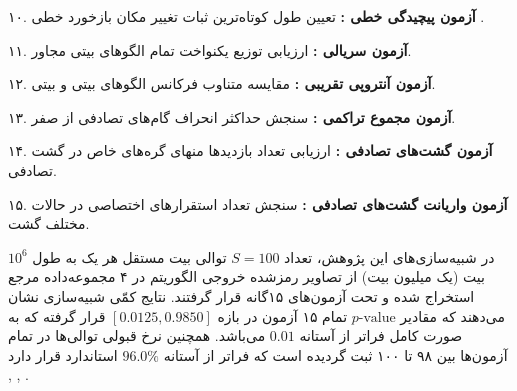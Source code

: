 ۱۰. \textbf{آزمون پیچیدگی خطی :} تعیین طول کوتاه‌ترین ثبات تغییر مکان بازخورد خطی .\par

۱۱. \textbf{آزمون سریالی :} ارزیابی توزیع یکنواخت تمام الگوهای ‌بیتی مجاور.\par

۱۲. \textbf{آزمون آنتروپی تقریبی :} مقایسه متناوب فرکانس الگوهای ‌بیتی و بیتی.\par

۱۳. \textbf{آزمون مجموع تراکمی :} سنجش حداکثر انحراف گام‌های تصادفی از صفر.\par

۱۴. \textbf{آزمون گشت‌های تصادفی :} ارزیابی تعداد بازدیدها منهای گره‌های خاص در گشت تصادفی.\par

۱۵. \textbf{آزمون واریانت گشت‌های تصادفی :} سنجش تعداد استقرارهای اختصاصی در حالات مختلف گشت.\par



در شبیه‌سازی‌های این پژوهش، تعداد $S = 100$ توالی بیت مستقل هر یک به طول $10^6$ بیت (یک میلیون بیت) از تصاویر رمزشده خروجی الگوریتم در ۴ مجموعه‌داده مرجع  استخراج شده و تحت آزمون‌های ۱۵گانه قرار گرفتند. نتایج کمّی شبیه‌سازی نشان می‌دهند که مقادیر $p\text{-value}$ تمام ۱۵ آزمون در بازه $[0.0125,\allowbreak{} 0.9850]$ قرار گرفته که به صورت کامل فراتر از آستانه $0.01$ می‌باشد. همچنین نرخ قبولی  توالی‌ها در تمام آزمون‌ها بین ۹۸ تا ۱۰۰ ثبت گردیده است که فراتر از آستانه $96.0\%$ استاندارد  قرار دارد , , .\par



